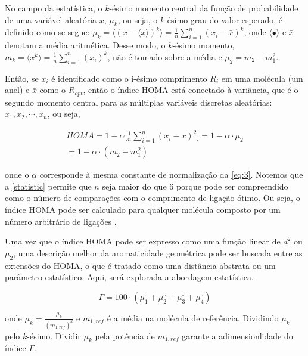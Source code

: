 No campo da estatística, o $k$-ésimo momento central da função de probabilidade de uma variável aleatória $x$, $\mu_k$, ou seja, o $k$-ésimo grau do valor esperado, é definido como se segue: $\mu_k = \langle (x - \langle x \rangle)^k \rangle = \displaystyle \frac{1}{n} \sum_{i = 1}^n (x_i - \bar{x})^k$, onde $\langle \bullet \rangle$ e $\bar{x}$ denotam a média aritmética.
Desse modo, o $k$-ésimo momento, $m_k = \langle x^k \rangle = \displaystyle \frac{1}{n} \sum_{i=1}^n (x_i)^k$, não é tomado sobre a média e $\mu_2 = m_2 - m_1^2$.

Então, se $x_i$ é identificado como o i-ésimo comprimento $R_i$ em uma molécula (um anel) e $\bar{x}$ como o $R_{opt}$, então o índice \gls{HOMA} está conectado à variância, que é o segundo momento central para as múltiplas variáveis discretas aleatórias: $x_1, x_2, \cdots, x_n$, ou seja, 

\begin{equation}
\label{statistic}
\begin{split}
    HOMA = 1 - \alpha \bigg[\frac{1}{n} \sum_{i=1}^n (x_i - \bar{x})^2 \bigg] = 1 - \alpha \cdot \mu_2 \\ = 1 - \alpha \cdot (m_2 - m_1^2 )
\end{split}
\end{equation}

\noindent onde o $\alpha$ corresponde à mesma constante de normalização da \autoref{eq:3}. Notemos que a \autoref{statistic} permite que $n$ seja maior do que 6 porque pode ser compreendido como o número de comparações com o comprimento de ligação ótimo. Ou seja, o índice \gls{HOMA} pode ser calculado para qualquer molécula composto por um número arbitrário de ligações .

Uma vez que o índice \gls{HOMA} pode ser expresso como uma função linear de $d^2$ ou $\mu_2$, uma descrição melhor da aromaticidade geométrica pode ser buscada entre as extensões do \gls{HOMA}, o que é tratado como uma distância abstrata ou um parâmetro estatístico. Aqui, será explorada a abordagem estatística.

\begin{equation}
    \Gamma = 100 \cdot (\mu_1^\circ + \mu_2^\circ + \mu_3^\circ + \mu_4^\circ)
\end{equation}

\noindent onde $\mu_k = \displaystyle \frac{\mu_k}{(m_{1, ref})^k}$ e $m_{1, ref}$ é a média na molécula de referência. Dividindo $\mu_k$ pelo $k$-ésimo. Dividir $\mu_k$ pela potência de $m_{1, ref}$ garante a adimensionlidade do índice $\Gamma$.
